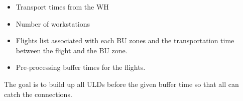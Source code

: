 \documentclass[11pt,a4paper,fleqn]{article}
\begin{document}
\begin{itemize}
	\item Transport times from the WH
\end{itemize}


\begin{itemize}

	\item Number of workstations
	

\end{itemize}

\begin{itemize}

	\item Flights list associated with each BU zones and the transportation time between the flight and the BU zone.
	

\end{itemize}

\begin{itemize}

	\item Pre-processing buffer times for the flights.
	
	
\end{itemize}

The goal is to build up all ULDs before the given buffer time so that all can catch the connections.

\end{document}
